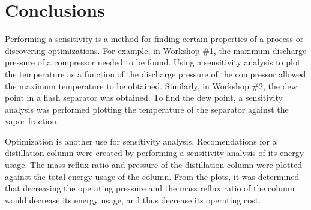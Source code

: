 \documentclass[12pt]{article}
\begin{document}
\section{Conclusions}

Performing a sensitivity is a method for finding certain properties of a process or discovering optimizations. For example, in Workshop \#1, the maximum discharge pressure of a compressor needed to be found. Using a sensitivity analysis to plot the temperature as a function of the discharge pressure of the compressor allowed the maximum temperature to be obtained. Similarly, in Workshop \#2, the dew point in a flash separator was obtained. To find the dew point, a sensitivity analysis was performed plotting the temperature of the separator against the vapor fraction.

Optimization is another use for sensitivity analysis. Recomendations for a distillation column were created by performing a sensitivity analysis of its energy usage. The mass reflux ratio and pressure of the distillation column were plotted against the total energy usage of the column. From the plots, it was determined that decreasing the operating pressure and the mass reflux ratio of the column would decrease its energy usage, and thus decrease its operating cost.
\end{document}
